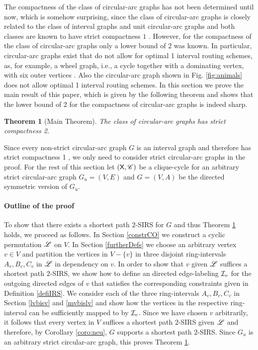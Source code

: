 \documentclass[10pt]{article}
\newtheorem{theorem}{Theorem}[section]
\begin{document}
The compactness of the class of circular-arc graphs has not been determined until now, 
which is somehow surprising, since the class of circular-arc graphs is closely related 
to the class of interval graphs and unit circular-arc graphs and both classes are known 
to have strict compactness $1$ \cite{NS96,FG98}. 
However, for the compactness of the class of circular-arc graphs only a lower bound of 2 was known.
In particular, circular-arc graphs exist that do not allow for optimal 1 interval routing schemes, as, for example, a wheel graph, i.e., a cycle together with a dominating vertex, with six outer vertices \cite{FG98}.
Also the circular-arc graph shown in Fig. \ref{fig:animals} does not allow optimal 1 interval routing schemes.
In this section we prove the main result of this paper, which is given by the following theorem and shows that the lower bound of 2 for the compactness of circular-arc graphs is indeed sharp.

\begin{theorem}[Main Theorem]\label{mainTheo}
The class of circular-arc graphs has strict compactness 2.
\end{theorem}



Since every non-strict circular-arc graph $G$ is an interval graph and therefore has strict compactness 1 \cite{NS96},  we only need to consider strict circular-arc graphs in the proof.
For the rest of this section let $(\mathsf{X},\mathscr{C})$ be a clique-cycle for an 
arbitrary strict circular-arc graph $G_u=(V,E)$ and $G=(V,A)$ be the directed symmetric 
version of $G_u$. 

\paragraph*{Outline of the proof}
To show that there exists a shortest path $2$-SIRS for $G$ and thus 
Theorem \ref{mainTheo} holds, we proceed as follows. 
In Section \ref{constrCO} we construct 
a cyclic permutation $\mathscr{L}$ on $V$.
In Section \ref{furtherDefs} we choose an arbitrary vertex $v\in V$ and partition the 
vertices in $V-\{v\}$ in three disjoint ring-intervals $A_v,B_v,C_v$ in $\mathscr{L}$ in 
dependency on $v$. 
In order to show that $v$ given $\mathscr{L}$ suffices a shortest path 2-SIRS, 
we show how to define an directed edge-labeling $\mathcal{I}_v$ for the outgoing directed edges of $v$ that 
satisfies the corresponding  constraints given in Definition \ref{defiIRS}. We
consider each of the three ring-intervals $A_v,B_v,C_v$ in 
Section  \ref{lvbisv} and \ref{mvbislv} and 
show how the vertices in the respective ring-interval can be sufficiently  mapped to 
by $\mathcal{I}_v$. 
Since we have chosen $v$ arbitrarily, it follows that every vertex in $V$ 
suffices a shortest path $2$-SIRS given $\mathscr{L}$ and therefore, by 
Corollary \ref{coro:neu}, $G$ supports a shortest path $2$-SIRS.
Since $G_u$ is an arbitrary strict circular-arc graph, this proves 
Theorem \ref{mainTheo}.
\end{document}

